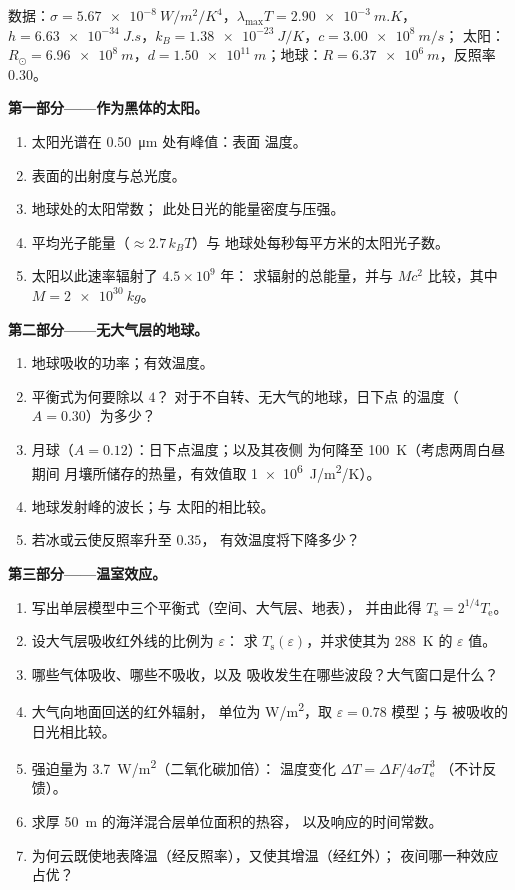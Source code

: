 \begin{problem}\label{pb:b2:thermal-radiation:1}
数据：$\sigma = \qty{5.67e-8}{W/m^2/K^4}$，$\lambda_{\max}T = \qty{2.90e-3}{m.K}$，
$h = \qty{6.63e-34}{J.s}$，$k_B = \qty{1.38e-23}{J/K}$，$c = \qty{3.00e8}{m/s}$；
太阳：$R_\odot = \qty{6.96e8}{m}$，$d = \qty{1.50e11}{m}$；地球：$R =
\qty{6.37e6}{m}$，反照率 $0.30$。

\textbf{第一部分——作为黑体的太阳。}
\begin{enumerate}
  \item 太阳光谱在 \qty{0.50}{\micro m} 处有峰值：表面
        温度。
  \item 表面的出射度与总光度。
  \item 地球处的太阳常数；
        此处日光的能量密度与压强。
  \item 平均光子能量（$\approx 2.7\,k_BT$）与
        地球处每秒每平方米的太阳光子数。
  \item 太阳以此速率辐射了 $4.5 \times 10^9$ 年：
        求辐射的总能量，并与 $Mc^2$ 比较，其中 $M = \qty{2e30}{kg}$。
\end{enumerate}

\textbf{第二部分——无大气层的地球。}
\begin{enumerate}[resume]
  \item 地球吸收的功率；有效温度。
  \item 平衡式为何要除以 $4$？
        对于不自转、无大气的地球，日下点
        的温度（$A = 0.30$）为多少？
  \item 月球（$A = 0.12$）：日下点温度；以及其夜侧
        为何降至 \qty{100}{K}（考虑两周白昼期间
        月壤所储存的热量，有效值取 \qty{1e6}{J/m^2/K}）。
  \item 地球发射峰的波长；与
        太阳的相比较。
  \item 若冰或云使反照率升至 $0.35$，
        有效温度将下降多少？
\end{enumerate}

\textbf{第三部分——温室效应。}
\begin{enumerate}[resume]
  \item 写出单层模型中三个平衡式（空间、大气层、地表），
        并由此得 $T_{\text{s}} = 2^{1/4}T_{\text{e}}$。
  \item 设大气层吸收红外线的比例为 $\varepsilon$：
        求 $T_{\text{s}}(\varepsilon)$，并求使其为
        \qty{288}{K} 的 $\varepsilon$ 值。
  \item 哪些气体吸收、哪些不吸收，以及
        吸收发生在哪些波段？大气窗口是什么？
  \item 大气向地面回送的红外辐射，
        单位为 \unit{W/m^2}，取 $\varepsilon = 0.78$ 模型；与
        被吸收的日光相比较。
  \item 强迫量为 \qty{3.7}{W/m^2}（二氧化碳加倍）：
        温度变化 $\Delta T = \Delta F/4\sigma T_{\text{e}}^3$
        （不计反馈）。
  \item 求厚 \qty{50}{m} 的海洋混合层单位面积的热容，
        以及响应的时间常数。
  \item 为何云既使地表降温（经反照率），又使其增温（经红外）；
        夜间哪一种效应占优？
\end{enumerate}


\end{problem}
